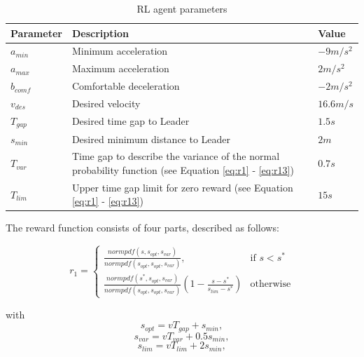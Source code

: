 \documentclass[review]{elsarticle}
\begin{document}
\begin{table}
\caption{RL agent parameters} 
\label{tab:agentParameters} 
\begin{center}
\begin{tabular}{ p{} p{} p{}}
	Parameter & Description & Value \\ \hline
	$a_{min}$ & Minimum acceleration & $-9m/s^2$ \\  
	$a_{max}$ & Maximum acceleration & $2m/s^2$ \\  
	$b_{comf}$ & Comfortable deceleration & $-2m/s^2$ \\  
	$v_{des}$ & Desired velocity & $16.6 m/s$ \\  		
	$T_{gap}$ & Desired time gap to Leader & $1.5s$ \\
	$s_{min}$ & Desired minimum distance to Leader & $2m$ \\
	$T_{var}$ & Time gap to describe the variance of the normal probability function (see Equation \ref{eq:r1} - \ref{eq:r13}) & $0.7s$ \\
	$T_{lim}$ & Upper time gap limit for zero reward (see Equation \ref{eq:r1} - \ref{eq:r13}) & $15s$ 
\end{tabular}
\end{center}
\end{table}


The reward function consists of four parts, described as follows:


\begin{equation}
\label{eq:r1}
r_1  = 
\begin{cases}
\frac{normpdf(s,  s_{opt},  s_{var})}{normpdf( s_{opt},  s_{opt},  s_{var})},& \text{if } s < s^*\\
\frac{normpdf(s^*,  s_{opt},  s_{var})}{normpdf( s_{opt},  s_{opt},  s_{var})} (1-\frac{s-s^*}{s_{lim} - s^*})              & \text{otherwise}
\end{cases}
\end{equation}



with
\begin{equation}
\label{eq:r11}
s_{opt} = vT_{gap} + s_{min},
\end{equation}
\begin{equation}
\label{eq:r12}
s_{var} = vT_{var} + 0.5s_{min},
\end{equation}
\begin{equation}
\label{eq:r13}
s_{lim} = vT_{lim} + 2s_{min},
\end{equation}
\end{document}
